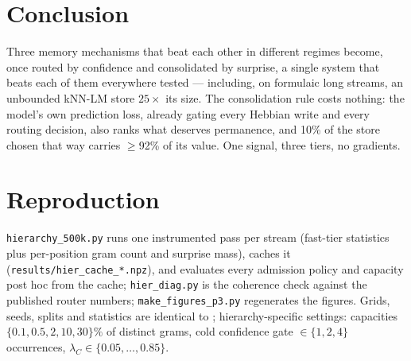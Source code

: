 \documentclass[11pt]{article}
\begin{document}
\section{Conclusion}

Three memory mechanisms that beat each other in different regimes become, once routed by confidence and consolidated by surprise, a single system that beats each of them everywhere tested --- including, on formulaic long streams, an unbounded kNN-LM store $25\times$ its size. The consolidation rule costs nothing: the model's own prediction loss, already gating every Hebbian write and every routing decision, also ranks what deserves permanence, and 10\% of the store chosen that way carries $\ge$92\% of its value. One signal, three tiers, no gradients.

\appendix

\section{Reproduction}

\texttt{hierarchy\_500k.py} runs one instrumented pass per stream (fast-tier statistics plus per-position gram count and surprise mass), caches it (\texttt{results/hier\_cache\_*.npz}), and evaluates every admission policy and capacity post hoc from the cache; \texttt{hier\_diag.py} is the coherence check against the published router numbers; \texttt{make\_figures\_p3.py} regenerates the figures. Grids, seeds, splits and statistics are identical to \cite{sillage,router}; hierarchy-specific settings: capacities $\{0.1, 0.5, 2, 10, 30\}\%$ of distinct grams, cold confidence gate $\in \{1,2,4\}$ occurrences, $\lambda_C \in \{0.05,\dots,0.85\}$.
\end{document}
